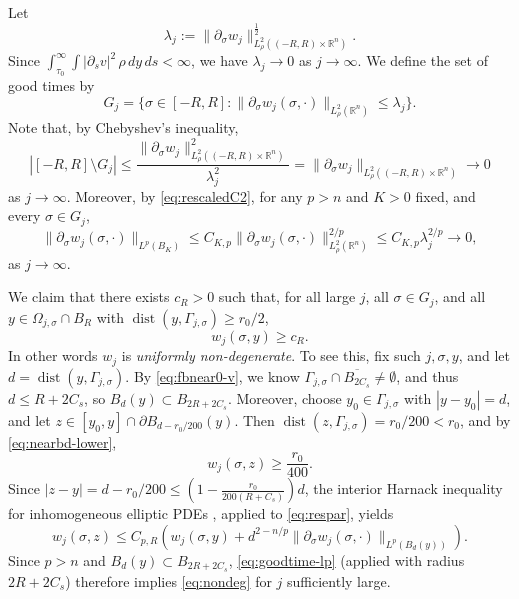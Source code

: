 \documentclass[11pt]{article}
\numberwithin{equation}{section}
\theoremstyle{definition}
\newcommand{\RR}{\mathbb{R}}
\begin{document}
Let 
\[ \lambda_j:= \|\partial_{\sigma}w_j\|_{L^2_\rho((-R,R)\times \RR^n)}^{\frac12}.\]
Since $\int_{\tau_0}^\infty\!\int|\partial_s v|^2\,\rho\,dy\,ds<\infty$, we have $\lambda_j \to 0$ as $j\to\infty$.
We define the set of good times by
\begin{equation*}
    G_j=\{\sigma \in [-R,R]: \|\partial_{\sigma} w_j(\sigma,\cdot)\|_{L^2_{\rho}(\RR^n)}\leq \lambda_j\}.
\end{equation*}
Note that, by Chebyshev's inequality,
\begin{equation}\label{eq:bad-times}
|[-R,R]\setminus G_j| \leq \frac{\|\partial_{\sigma}w_j\|_{L^2_{\rho}((-R,R)\times \RR^n)}^2}{\lambda_j^2}=\|\partial_{\sigma}w_j\|_{L^2_{\rho}((-R,R)\times \RR^n)}\to 0 
\end{equation}
as $j\to \infty$. Moreover, by \eqref{eq:rescaledC2}, for any $p>n$ and $K>0$ fixed, and every $\sigma \in G_j$,
\begin{equation}\label{eq:goodtime-lp}
    \|\partial_{\sigma}w_j(\sigma,\cdot)\|_{L^p(B_K)}\leq C_{K,p} \|\partial_{\sigma}w_j(\sigma,\cdot)\|_{L^2_\rho(\RR^n)}^{2/p}\leq C_{K,p}\lambda_j^{2/p} \to 0, 
\end{equation}
as $j\to \infty$.


 We claim that there exists $c_R>0$ such that, for all large $j$, all $\sigma\in G_j$, and all $y\in \Omega_{j,\sigma}\cap B_R$ with $\operatorname{dist}(y,\Gamma_{j,\sigma})\geq r_0/2$, 
\begin{equation}\label{eq:nondeg}
w_j(\sigma,y)\geq c_R.
\end{equation}
In other words $w_j$ is \emph{uniformly non-degenerate}.
To see this, fix such $j, \sigma, y$, and let $d=\operatorname{dist}(y,\Gamma_{j,\sigma})$.
By \eqref{eq:fbnear0-v}, we know $\Gamma_{j,\sigma}\cap \overline{B_{2C_s}} \neq \emptyset$, and thus $d\leq R+2C_s$, so $B_d(y)\subset B_{2R+2C_s}$.  
Moreover, choose $y_0\in \Gamma_{j,\sigma}$ with $|y-y_0|=d$, and let $z\in [y_0,y]\cap \partial B_{d-r_0/200}(y)$. Then $\operatorname{dist}(z,\Gamma_{j,\sigma})=r_0/200<r_0$, and by \eqref{eq:nearbd-lower},
\begin{equation*}
    w_j(\sigma,z)\geq \frac{r_0}{400}.
\end{equation*}
Since $|z-y|=d-r_0/200\leq (1-\frac{r_0}{200(R+C_s)})d$, the interior Harnack inequality for inhomogeneous elliptic PDEs \cite[Theorems 8.17 and 8.18]{GT}, applied to \eqref{eq:respar}, yields
\begin{equation*}
w_j(\sigma,z)\leq C_{p,R}(w_j(\sigma,y)+ d^{2-n/p}\|\partial_{\sigma}w_j(\sigma,\cdot)\|_{L^p(B_d(y))}).
\end{equation*}
Since $p>n$ and $B_d(y)\subset B_{2R+2C_s}$, \eqref{eq:goodtime-lp} (applied with radius $2R+2C_s$) therefore implies \eqref{eq:nondeg} for $j$ sufficiently large. 
\end{document}
